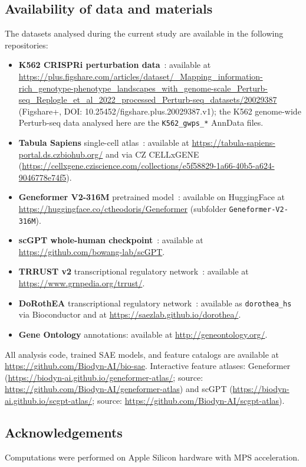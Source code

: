 \documentclass[onecolumn]{article}
\begin{document}
\subsection*{Availability of data and materials}
The datasets analysed during the current study are available in the following repositories:
\begin{itemize}
\item \textbf{K562 CRISPRi perturbation data}~\cite{replogle2022mapping}: available at \url{https://plus.figshare.com/articles/dataset/_Mapping_information-rich_genotype-phenotype_landscapes_with_genome-scale_Perturb-seq_Replogle_et_al_2022_processed_Perturb-seq_datasets/20029387} (Figshare+, DOI: 10.25452/figshare.plus.20029387.v1); the K562 genome-wide Perturb-seq data analysed here are the \texttt{K562\_gwps\_*} AnnData files.
\item \textbf{Tabula Sapiens} single-cell atlas~\cite{tabula2022tabula}: available at \url{https://tabula-sapiens-portal.ds.czbiohub.org/} and via CZ CELLxGENE (\url{https://cellxgene.cziscience.com/collections/e5f58829-1a66-40b5-a624-9046778e74f5}).
\item \textbf{Geneformer V2-316M} pretrained model~\cite{theodoris2023transfer}: available on HuggingFace at \url{https://huggingface.co/ctheodoris/Geneformer} (subfolder \texttt{Geneformer-V2-316M}).
\item \textbf{scGPT whole-human checkpoint}~\cite{cui2024scgpt}: available at \url{https://github.com/bowang-lab/scGPT}.
\item \textbf{TRRUST v2} transcriptional regulatory network~\cite{han2018trrust}: available at \url{https://www.grnpedia.org/trrust/}.
\item \textbf{DoRothEA} transcriptional regulatory network~\cite{garcia-alonso2019dorothea}: available as \texttt{dorothea\_hs} via Bioconductor and at \url{https://saezlab.github.io/dorothea/}.
\item \textbf{Gene Ontology} annotations: available at \url{http://geneontology.org/}.
\end{itemize}
All analysis code, trained SAE models, and feature catalogs are available at \url{https://github.com/Biodyn-AI/bio-sae}. Interactive feature atlases: Geneformer (\url{https://biodyn-ai.github.io/geneformer-atlas/}; source: \url{https://github.com/Biodyn-AI/geneformer-atlas}) and scGPT (\url{https://biodyn-ai.github.io/scgpt-atlas/}; source: \url{https://github.com/Biodyn-AI/scgpt-atlas}).

\subsection*{Acknowledgements}
Computations were performed on Apple Silicon hardware with MPS acceleration.



\end{document}

